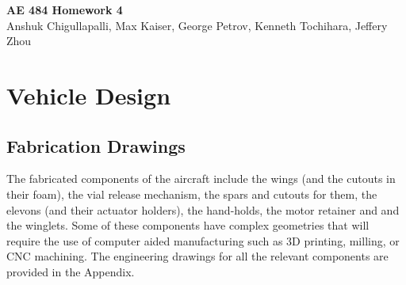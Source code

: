 




\begin{center}
    {\Large\textbf{AE 484 Homework 4}}\\
    Anshuk Chigullapalli, Max Kaiser, George Petrov, Kenneth Tochihara, Jeffery Zhou\\
\end{center}

\section{Vehicle Design}

    \subsection{Fabrication Drawings}
    
        The fabricated components of the aircraft include the  wings (and the cutouts in their foam), the vial release mechanism, the spars and cutouts for them, the elevons (and their actuator holders), the hand-holds, the motor retainer and and the winglets. Some of these components have complex geometries that will require the use of computer aided manufacturing such as 3D printing, milling, or CNC machining. The engineering drawings for all the relevant components are provided in the Appendix.
    
